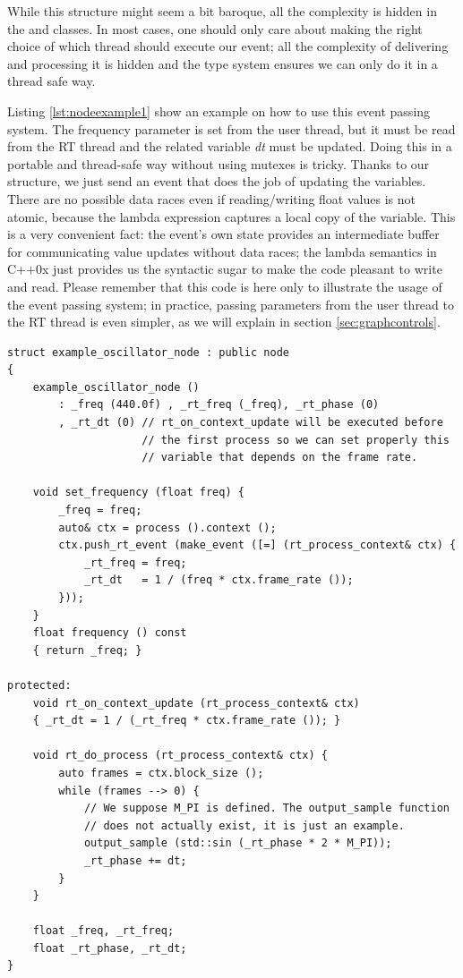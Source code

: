 While this structure might seem a bit baroque, all the complexity is
hidden in the  and 
classes. In most cases, one should only care about making the right
choice of which thread should execute our event; all the complexity of
delivering and processing it is hidden and the type system ensures
we can only do it in a thread safe way.

Listing \ref{lst:nodeexample1} show an example on how to use this
event passing system. The frequency parameter is set from the user
thread, but it must be read from the RT thread and the related
variable \emph{dt} must be updated. Doing this in a portable and
thread-safe way without using mutexes is tricky. Thanks to our
structure, we just send an event that does the job of updating the
variables. There are no possible data races even if reading/writing
float values is not atomic, because the lambda expression captures a
local copy of the  variable. This is a very convenient
fact: the event's own state provides an intermediate buffer for
communicating value updates without data races; the lambda semantics
in C++0x just provides us the syntactic sugar to make the code
pleasant to write and read. Please remember that this code is here
only to illustrate the usage of the event passing system; in practice,
passing parameters from the user thread to the RT thread is even
simpler, as we will explain in section \ref{sec:graphcontrols}.


\begin{lstlisting}[float=h, label=lst:nodeexample1, caption=A thread communication use-case]
struct example_oscillator_node : public node
{
    example_oscillator_node ()
        : _freq (440.0f) , _rt_freq (_freq), _rt_phase (0)
        , _rt_dt (0) // rt_on_context_update will be executed before
                     // the first process so we can set properly this
                     // variable that depends on the frame rate.
    
    void set_frequency (float freq) {
        _freq = freq;
        auto& ctx = process ().context ();
        ctx.push_rt_event (make_event ([=] (rt_process_context& ctx) {
            _rt_freq = freq;
            _rt_dt   = 1 / (freq * ctx.frame_rate ());
        }));
    }
    float frequency () const
    { return _freq; }

protected:
    void rt_on_context_update (rt_process_context& ctx)
    { _rt_dt = 1 / (_rt_freq * ctx.frame_rate ()); }

    void rt_do_process (rt_process_context& ctx) {
        auto frames = ctx.block_size ();
        while (frames --> 0) {
            // We suppose M_PI is defined. The output_sample function
            // does not actually exist, it is just an example.
            output_sample (std::sin (_rt_phase * 2 * M_PI));
            _rt_phase += dt;
        }
    }

    float _freq, _rt_freq;
    float _rt_phase, _rt_dt;
}
\end{lstlisting}

